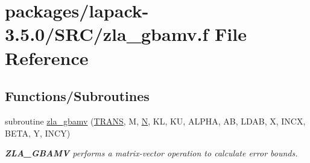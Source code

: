 \hypertarget{zla__gbamv_8f}{}\section{packages/lapack-\/3.5.0/\+S\+R\+C/zla\+\_\+gbamv.f File Reference}
\label{zla__gbamv_8f}
\subsection*{Functions/\+Subroutines}
\begin{DoxyCompactItemize}
\item 
subroutine \hyperlink{group__complex16GBcomputational_gaf0580d30a1bd07214f6068317a467e34}{zla\+\_\+gbamv} (\hyperlink{superlu__enum__consts_8h_a0c4e17b2d5cea33f9991ccc6a6678d62a1f61e3015bfe0f0c2c3fda4c5a0cdf58}{T\+R\+A\+N\+S}, M, \hyperlink{polmisc_8c_a0240ac851181b84ac374872dc5434ee4}{N}, K\+L, K\+U, A\+L\+P\+H\+A, A\+B, L\+D\+A\+B, X, I\+N\+C\+X, B\+E\+T\+A, Y, I\+N\+C\+Y)
\begin{DoxyCompactList}\small\item\em {\bfseries Z\+L\+A\+\_\+\+G\+B\+A\+M\+V} performs a matrix-\/vector operation to calculate error bounds. \end{DoxyCompactList}\end{DoxyCompactItemize}
